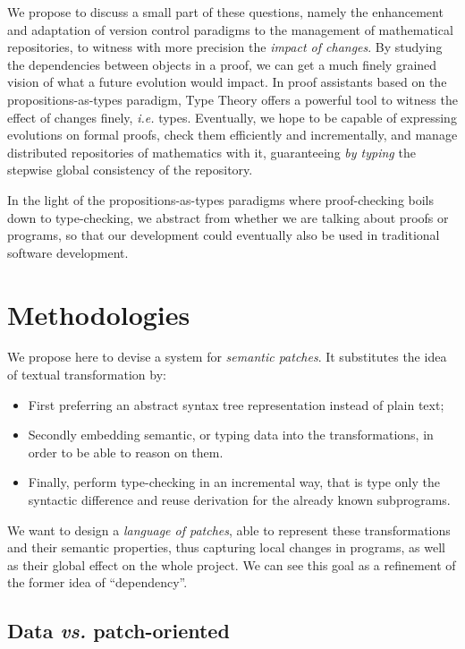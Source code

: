 \documentclass{article}
\begin{document}
We propose to discuss a small part of these questions, namely the
enhancement and adaptation of version control paradigms to the
management of mathematical repositories, to witness with more
precision the \emph{impact of changes}. By studying the dependencies
between objects in a proof, we can get a much finely grained vision of
what a future evolution would impact. In proof assistants based on the
propositions-as-types paradigm, Type Theory offers a powerful tool to
witness the effect of changes finely, \emph{i.e.} types. Eventually,
we hope to be capable of expressing evolutions on formal proofs, check
them efficiently and incrementally, and manage distributed
repositories of mathematics with it, guaranteeing \emph{by typing} the
stepwise global consistency of the repository.

In the light of the propositions-as-types paradigms where
proof-checking boils down to type-checking, we abstract from whether
we are talking about proofs or programs, so that our development could
eventually also be used in traditional software development.

\section{Methodologies}

We propose here to devise a system for \emph{semantic patches}. It
substitutes the idea of textual transformation by:
\begin{itemize}
\item First preferring an abstract syntax tree representation instead
  of plain text;
\item Secondly embedding semantic, or typing data into the
  transformations, in order to be able to reason on them.
\item Finally, perform type-checking in an incremental way, that is
  type only the syntactic difference and reuse derivation for the
  already known subprograms.
\end{itemize}

We want to design a \emph{language of patches}, able to represent
these transformations and their semantic properties, thus capturing
local changes in programs, as well as their global effect on the whole
project. We can see this goal as a refinement of the former idea of
``dependency''.

\subsection{Data \emph{vs.} patch-oriented}
\end{document}
